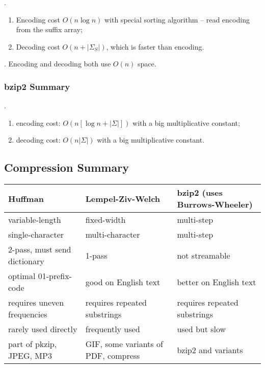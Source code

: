 \documentclass{article}
\begin{document}
\begin{result}.
    \begin{enumerate}
        \item Encoding cost $O(n \log n)$ with special sorting algorithm -- read encoding from the suffix array; 
        \item Decoding cost $O(n + |\Sigma_S|)$, which is faster than encoding. 
    \end{enumerate}
    \begin{comm}[].
        Encoding and decoding both use $O(n)$ space. 
    \end{comm}
\end{result}

\subsubsection{bzip2 Summary} 

\begin{result}[].
    \begin{enumerate}
        \item encoding cost: $O (n [\log n + |\Sigma|])$ with a big multiplicative constant; 
        \item decoding cost: $O (n |\Sigma|)$ with a big multiplicative constant. 
    \end{enumerate}
\end{result}

\newpage

\subsection{Compression Summary} 

\begin{center}
    \begin{tabular}{l l l}
    \toprule
        Huffman & Lempel-Ziv-Welch & bzip2 (uses Burrows-Wheeler) \\
    \midrule
        variable-length & fixed-width & multi-step \\
        single-character & multi-character & multi-step \\
        2-pass, must send dictionary & 1-pass & not streamable \\
        optimal 01-prefix-code & good on English text & better on English text \\
        requires uneven frequencies & requires repeated substrings & requires repeated substrings \\
        rarely used directly & frequently used & used but slow \\
        part of pkzip, JPEG, MP3 & GIF, some variants of PDF, compress & bzip2 and variants \\
    \bottomrule
    \end{tabular}
\end{center}
\end{document}

